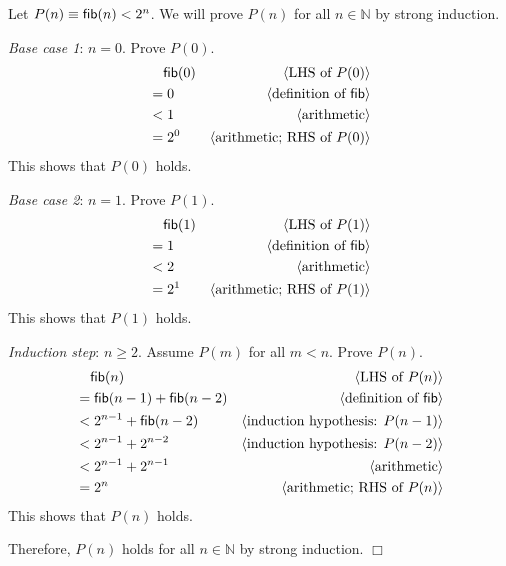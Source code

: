 \documentclass[11pt,fleqn]{article}
\newcommand{\sglsp}{\ }
\newcommand{\mname}[1]{\mbox{\sf #1}}
\newenvironment{proof}{\par\noindent{\bf Proof\sglsp}}{\hfill$\Box$}
\newcommand{\pnote}[1]{{\langle \text{#1} \rangle}}
\begin{document}
\begin{proof}
Let $P(n) \equiv \mname{fib}(n) < 2^n$.  We will prove $P(n)$
for all $n \in \mathbb{N}$ by strong induction.

\medskip

\emph{Base case 1}: $n = 0$. Prove $P(0)$.
\begin{align*}
  &\phantom{{}=} \mname{fib}(0) & \pnote{LHS of $P(0)$}\\
  &= 0                          & \pnote{definition of \mname{fib}}\\
  &< 1                          & \pnote{arithmetic}\\
  &= 2^0                        & \pnote{arithmetic; RHS of $P(0)$}
\end{align*}
This shows that $P(0)$ holds.

\medskip

\emph{Base case 2}: $n = 1$.  Prove $P(1)$.
\begin{align*}
  &\phantom{{}=} \mname{fib}(1) & \pnote{LHS of $P(1)$}\\
 &= 1                           & \pnote{definition of \mname{fib}}\\
 &< 2                           & \pnote{arithmetic}\\
 &= 2^1                         & \pnote{arithmetic; RHS of $P(1)$}
\end{align*}
This shows that $P(1)$ holds.

\medskip

\emph{Induction step}: $n \ge 2$. Assume $P(m)$ for all $m <
n$. Prove $P(n)$.
\begin{align*}
  &\phantom{{}=} \mname{fib}(n)              & \pnote{LHS of $P(n)$}\\
  &= \mname{fib}(n - 1) + \mname{fib}(n - 2) & \pnote{definition of \mname{fib}}\\
  &< 2^{n-1} + \mname{fib}(n - 2)            & \pnote{induction hypothesis: $P(n-1)$}\\
  &< 2^{n-1} + 2^{n-2}                        & \pnote{induction hypothesis: $P(n-2)$}\\
  &< 2^{n-1} + 2^{n-1}                        & \pnote{arithmetic}\\
  &= 2^n                                     & \pnote{arithmetic; RHS of $P(n)$}
\end{align*}
This shows that $P(n)$ holds.

\medskip

Therefore, $P(n)$ holds for all $n \in \mathbb{N}$ by strong induction.
\end{proof}
\end{document}
